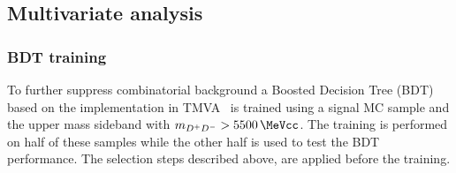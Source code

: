 \subsection{Multivariate analysis}
\label{sec:b02dd:selection:mva}

\subsubsection*{BDT training}
\label{sec:b02dd:selection:mva:training}

To further suppress combinatorial background a Boosted Decision Tree
(BDT)~\cite{Breiman,Roe} based on the implementation in
TMVA~\cite{Hocker:2007ht} is trained using a signal MC sample and the upper
mass sideband with $m_{\Dp\Dm} > \SI{5500}{\MeVcc}$. The training is performed
on half of these samples while the other half is used to test the BDT
performance. The selection steps described above, are applied before the
training.

